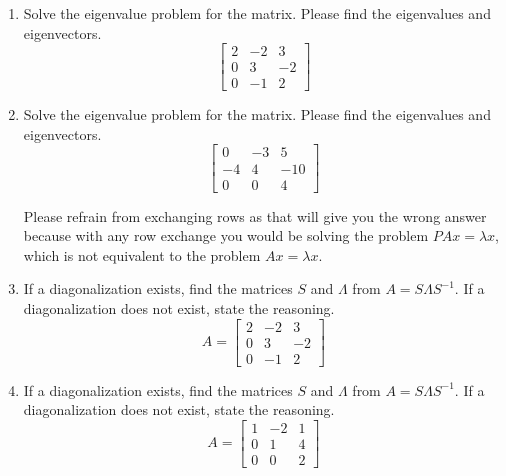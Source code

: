 \documentclass[reqno]{amsart}
\theoremstyle{definition}
\begin{document}
\begin{enumerate}
\item  Solve the eigenvalue problem for the matrix.  Please find the eigenvalues and eigenvectors.
%
\begin{equation*}
\begin{bmatrix}
2 & -2 & 3\\
0 & 3 & -2\\
0 & -1 & 2
\end{bmatrix}
\end{equation*}

\item  Solve the eigenvalue problem for the matrix.  Please find the eigenvalues and eigenvectors.
%
\begin{equation*}
\begin{bmatrix}
0 & -3 & 5\\
-4 & 4 & -10\\
0 & 0 & 4
\end{bmatrix}
\end{equation*}

Please refrain from exchanging rows as that will give you the wrong answer because with
any row exchange you would be solving the problem $PAx = \lambda x$, which is not equivalent
to the problem $Ax = \lambda x$.

\item  If a diagonalization exists, find the matrices $S$ and $\Lambda$ from $A = S\Lambda S^{-1}$.
If a diagonalization does not exist, state the reasoning.
%
\begin{equation*}
A = \begin{bmatrix}
2 & -2 & 3\\
0 & 3 & -2\\
0 & -1 & 2
\end{bmatrix}
\end{equation*}

\item  If a diagonalization exists, find the matrices $S$ and $\Lambda$ from $A = S\Lambda S^{-1}$.
If a diagonalization does not exist, state the reasoning.
%
\begin{equation*}
A = \begin{bmatrix}
1 & -2 & 1\\
0 & 1 & 4\\
0 & 0 & 2
\end{bmatrix}
\end{equation*}

\end{enumerate}
\end{document}
